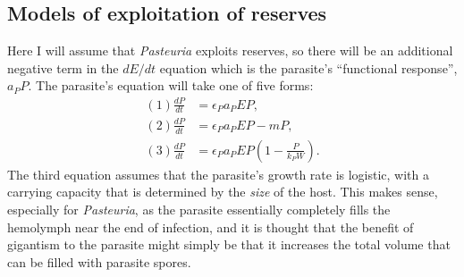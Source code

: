 \documentclass[12pt,reqno,final,pdftex]{amsart}\usepackage[]{graphicx}\usepackage[]{color}
\theoremstyle{plain}
\numberwithin{equation}{part}
\begin{document}
\subsection*{Models of exploitation of reserves}
Here I will assume that \emph{Pasteuria} exploits reserves, so there will be an additional negative term in the $dE/dt$ equation which is the parasite's ``functional response'', $a_P P$.
The parasite's equation will take one of five forms:
\begin{align}
(1) \frac{dP}{dt} &= \epsilon_P a_P E P, \\
(2) \frac{dP}{dt} &= \epsilon_P a_P E P - m P, \\
(3) \frac{dP}{dt} &= \epsilon_P a_P E P \left(1 - \frac{P}{k_P W}\right).
\end{align}
The third equation assumes that the parasite's growth rate is
logistic, with a carrying capacity that is determined by the
\emph{size} of the host.
This makes sense, especially for \emph{Pasteuria}, as the parasite
essentially completely fills the hemolymph near the end of infection,
and it is thought that the benefit of gigantism to the parasite might
simply be that it increases the total volume that can be filled with
parasite spores.
\end{document}
